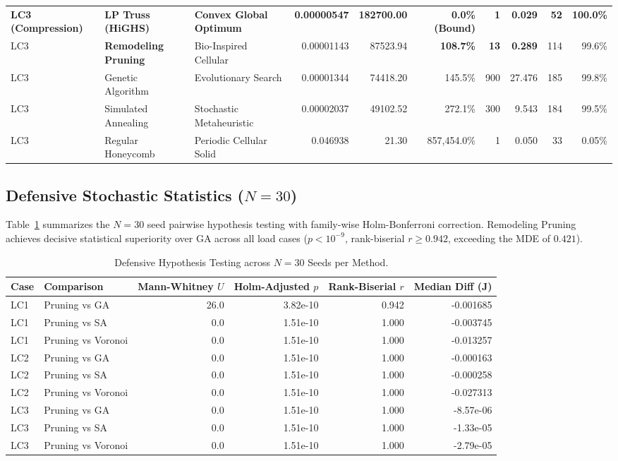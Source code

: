 \documentclass[10pt,journal,compsoc]{IEEEtran}
\begin{document}
\begin{table}[t]
\begin{tabular}{lllrrrrrrr}
\textbf{LC3 (Compression)} & \textbf{LP Truss (HiGHS)} & \textbf{Convex Global Optimum} & \textbf{0.00000547} & \textbf{182700.00} & \textbf{0.0\% (Bound)} & \textbf{1} & \textbf{0.029} & \textbf{52} & \textbf{100.0\%} \\
LC3 & \textbf{Remodeling Pruning} & Bio-Inspired Cellular & 0.00001143 & 87523.94 & \textbf{108.7\%} & \textbf{13} & \textbf{0.289} & 114 & 99.6\% \\
LC3 & Genetic Algorithm & Evolutionary Search & 0.00001344 & 74418.20 & 145.5\% & 900 & 27.476 & 185 & 99.8\% \\
LC3 & Simulated Annealing & Stochastic Metaheuristic & 0.00002037 & 49102.52 & 272.1\% & 300 & 9.543 & 184 & 99.5\% \\
LC3 & Regular Honeycomb & Periodic Cellular Solid & 0.046938 & 21.30 & 857,454.0\% & 1 & 0.050 & 33 & 0.05\% \\
\bottomrule
\end{tabular}
\end{table}

\subsection{Defensive Stochastic Statistics ($N=30$)}
Table~\ref{tab:stochastic_tests} summarizes the $N=30$ seed pairwise hypothesis testing with family-wise Holm-Bonferroni correction. Remodeling Pruning achieves decisive statistical superiority over GA across all load cases ($p < 10^{-9}$, rank-biserial $r \ge 0.942$, exceeding the MDE of $0.421$).

\begin{table}[htbp]
\caption{Defensive Hypothesis Testing across $N=30$ Seeds per Method.}
\label{tab:stochastic_tests}
\centering
\scriptsize
\begin{tabular}{llrrrr}
\toprule
Case & Comparison & Mann-Whitney $U$ & Holm-Adjusted $p$ & Rank-Biserial $r$ & Median Diff (J) \\
\midrule
LC1 & Pruning vs GA & 26.0 & 3.82e-10 & 0.942 & -0.001685 \\
LC1 & Pruning vs SA & 0.0  & 1.51e-10 & 1.000 & -0.003745 \\
LC1 & Pruning vs Voronoi & 0.0 & 1.51e-10 & 1.000 & -0.013257 \\
\midrule
LC2 & Pruning vs GA & 0.0 & 1.51e-10 & 1.000 & -0.000163 \\
LC2 & Pruning vs SA & 0.0 & 1.51e-10 & 1.000 & -0.000258 \\
LC2 & Pruning vs Voronoi & 0.0 & 1.51e-10 & 1.000 & -0.027313 \\
\midrule
LC3 & Pruning vs GA & 0.0 & 1.51e-10 & 1.000 & -8.57e-06 \\
LC3 & Pruning vs SA & 0.0 & 1.51e-10 & 1.000 & -1.33e-05 \\
LC3 & Pruning vs Voronoi & 0.0 & 1.51e-10 & 1.000 & -2.79e-05 \\
\bottomrule
\end{tabular}
\end{table}
\end{document}
